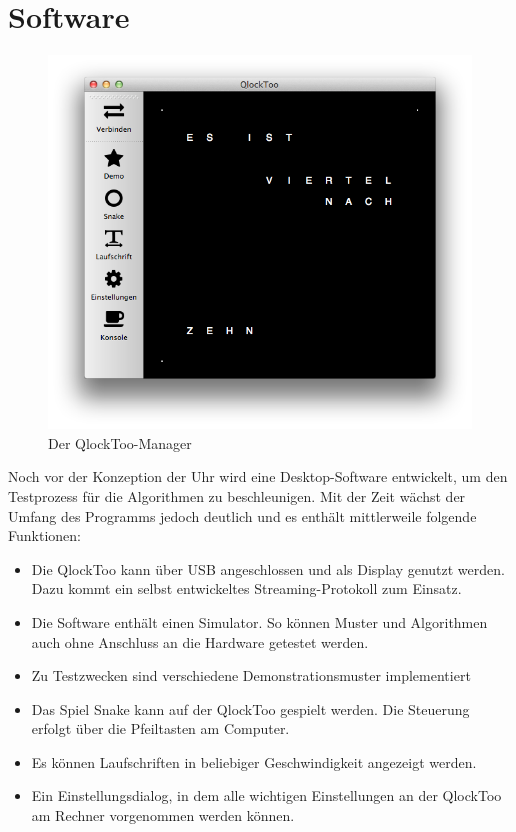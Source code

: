 \section{Software}
\label{sec:Software}
%
\begin{figure}[h]
    \centering
    \includegraphics[width=\columnwidth]{Abbildungen/Manager}
    \caption[QlockToo-Manager]{Der QlockToo-Manager}
    \label{fig:Manager}
\end{figure}
%
Noch vor der Konzeption der Uhr wird eine Desktop-Software entwickelt, um den Testprozess für die Algorithmen zu beschleunigen. Mit der Zeit wächst der Umfang des Programms jedoch deutlich und es enthält mittlerweile folgende Funktionen:

\begin{itemize}
\item Die QlockToo kann über USB angeschlossen und als Display genutzt werden. Dazu kommt ein selbst entwickeltes Streaming-Protokoll zum Einsatz.
\item Die Software enthält einen Simulator. So können Muster und Algorithmen auch ohne Anschluss an die Hardware getestet werden.
\item Zu Testzwecken sind verschiedene Demonstrationsmuster implementiert
\item Das Spiel Snake kann auf der QlockToo gespielt werden. Die Steuerung erfolgt über die Pfeiltasten am Computer.
\item Es können Laufschriften in beliebiger Geschwindigkeit angezeigt werden.
\item Ein Einstellungsdialog, in dem alle wichtigen Einstellungen an der QlockToo am Rechner vorgenommen werden können.
\end{itemize}

